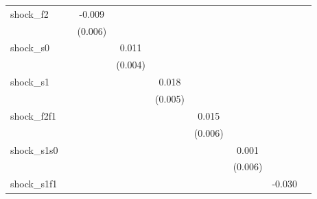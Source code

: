 {\begin{tabular}{l*{8}{c}}
\addlinespace
shock\_f2    &                     &      -0.009         &                     &                     &                     &                     &                     &                     \\
            &                     &     (0.006)         &                     &                     &                     &                     &                     &                     \\
\addlinespace
shock\_s0    &                     &                     &       0.011\sym{**} &                     &                     &                     &                     &                     \\
            &                     &                     &     (0.004)         &                     &                     &                     &                     &                     \\
\addlinespace
shock\_s1    &                     &                     &                     &       0.018\sym{***}&                     &                     &                     &                     \\
            &                     &                     &                     &     (0.005)         &                     &                     &                     &                     \\
\addlinespace
shock\_f2f1  &                     &                     &                     &                     &       0.015\sym{**} &                     &                     &                     \\
            &                     &                     &                     &                     &     (0.006)         &                     &                     &                     \\
\addlinespace
shock\_s1s0  &                     &                     &                     &                     &                     &       0.001         &                     &                     \\
            &                     &                     &                     &                     &                     &     (0.006)         &                     &                     \\
\addlinespace
shock\_s1f1  &                     &                     &                     &                     &                     &                     &      -0.030\sym{**} &                     \\

\end{tabular}}
